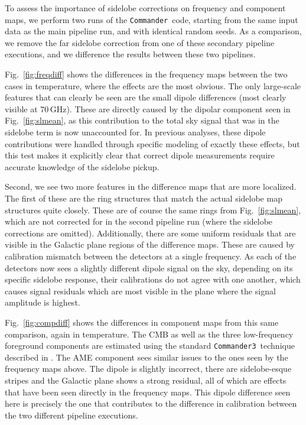 \documentclass[twocolumn]{aa}
\def\commander{\texttt{Commander}}
\def\commanderthree{\texttt{Commander3}}
\begin{document}
To assess the importance of sidelobe corrections on frequency and component maps, we perform two runs of the  \commander\ code, starting from the same input data as the main pipeline run, and with identical random seeds. As a comparison, we remove the far sidelobe correction from one of these secondary pipeline executions, and we difference the results between these two pipelines. 

Fig.~\ref{fig:freqdiff} shows the differences in the frequency maps between the two cases in temperature, where the effects are the most obvious. The only large-scale features that can clearly be seen are the small dipole differences (most clearly visible at 70\,GHz). These are directly caused by the dipolar component seen in Fig.~\ref{fig:slmean}, as this contribution to the total sky signal that was in the sidelobe term is now unaccounted for. In previous analyses, these dipole contributions were handled through specific modeling of exactly these effects, but this test makes it explicitly clear that correct dipole measurements require accurate knowledge of the sidelobe pickup.

Second, we see two more features in the difference maps that are more localized. The first of these are the ring structures that match the actual sidelobe map structures quite closely. These are of course the same rings from Fig.~\ref{fig:slmean}, which are not corrected for in the second pipeline run (where the sidelobe corrections are omitted). Additionally, there are some uniform residuals that are visible in the Galactic plane regions of the difference maps. These are caused by calibration mismatch between the detectors at a single frequency. As each of the detectors now sees a slightly different dipole signal on the sky, depending on its specific sidelobe response, their calibrations do not agree with one another, which causes signal residuals which are most visible in the plane where the signal amplitude is highest.

Fig.~\ref{fig:compdiff} shows the differences in component maps from this same comparison, again in temperature. The CMB as well as the three low-frequency foreground components are estimated using the standard \commanderthree\ technique described in \cite{bp13}. The AME component sees similar issues to the ones seen by the frequency maps above. The dipole is slightly incorrect, there are sidelobe-esque stripes and the Galactic plane shows a strong residual, all of which are effects that have been seen directly in the frequency maps. This dipole difference seen here is precisely the one that contributes to the difference in calibration between the two different pipeline executions. 
\end{document}
